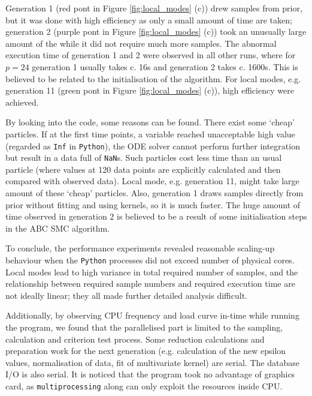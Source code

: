 
Generation 1 (red pont in Figure \ref{fig:local_modes} (c)) drew samples from prior, but it was done with high efficiency as only a small amount of time are taken; generation 2 (purple pont in Figure \ref{fig:local_modes} (c)) took an unusually large amount of the while it did not require much more samples. The abnormal execution time of generation 1 and 2 were observed in all other runs, where for $p=24$ generation 1 usually takes c. 16s and generation 2 takes c. 1600s. This is believed to be related to the initialisation of the algorithm. For local modes, e.g. generation 11 (green pont in Figure \ref{fig:local_modes} (c)), high efficiency were achieved.

By looking into the code, some reasons can be found. There exist some `cheap' particles. If at the first time points, a variable reached unacceptable high value (regarded as \verb|Inf| in \verb|Python|), the ODE solver cannot perform further integration but result in a data full of \verb|NaN|s. Such particles cost less time than an usual particle (where values at 120 data points are explicitly calculated and then compared with observed data). Local mode, e.g. generation 11, might take large amount of these `cheap' particles. Also, generation 1 draws samples directly from prior without fitting and using kernels, so it is much faster. The huge amount of time observed in generation 2 is believed to be a result of some initialisation steps in the ABC SMC algorithm.

To conclude, the performance experiments revealed reasonable scaling-up behaviour when the \verb|Python| processes did not exceed number of physical cores. Local modes lead to high variance in total required number of samples, and the relationship between required sample numbers and required execution time are not ideally linear; they all made further detailed analysis difficult.

Additionally, by observing CPU frequency and load curve in-time while running the program, we found that the parallelised part is limited to the sampling, calculation and criterion test process. Some reduction calculations and preparation work for the next generation (e.g. calculation of the new epsilon values, normalisation of data, fit of multivariate kernel) are serial. The database I/O is also serial.  It is noticed that the program took no advantage of graphics card, as \verb|multiprocessing| along can only exploit the resources inside CPU. 

